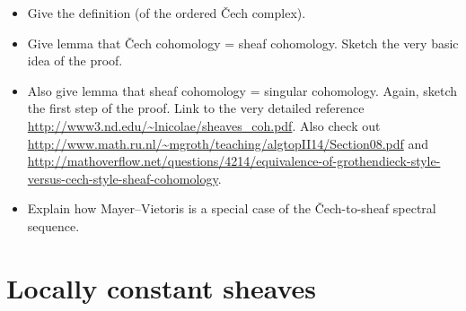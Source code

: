 \documentclass[10pt]{amsart}
\theoremstyle{definition}
\theoremstyle{plain}
\theoremstyle{remark}
\begin{document}
\begin{itemize}
\item Give the definition (of the ordered Čech complex).
\item Give lemma that Čech cohomology = sheaf cohomology. Sketch the very basic
idea of the proof.
\item Also give lemma that sheaf cohomology = singular cohomology. Again,
sketch the first step of the proof. Link to the very detailed reference
\url{http://www3.nd.edu/~lnicolae/sheaves_coh.pdf}. Also check out
\url{http://www.math.ru.nl/~mgroth/teaching/algtopII14/Section08.pdf} and
\url{http://mathoverflow.net/questions/4214/equivalence-of-grothendieck-style-versus-cech-style-sheaf-cohomology}.
\item Explain how Mayer--Vietoris is a special case of the Čech-to-sheaf
spectral sequence.
\end{itemize}



\section*{Locally constant sheaves}
\end{document}
